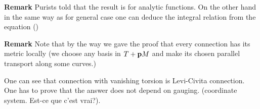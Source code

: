  {\bf Remark} Purists told that the result is for analytic functions. On the other hand in the same way as for
 general case one can deduce the integral relation from the equation ()

{\bf Remark} Note that by the way we gave the proof that every connection has its metric locally
(we choose any basis in $T+{\bf p} M$ and make its chosen parallel transport along some curves.)

One can see that connection with vanishing torsion is
Levi-Civita connection. One has to prove that the answer does not depend on gauging. (coordinate system. Est-ce que c'est vrai?).


          \bye

